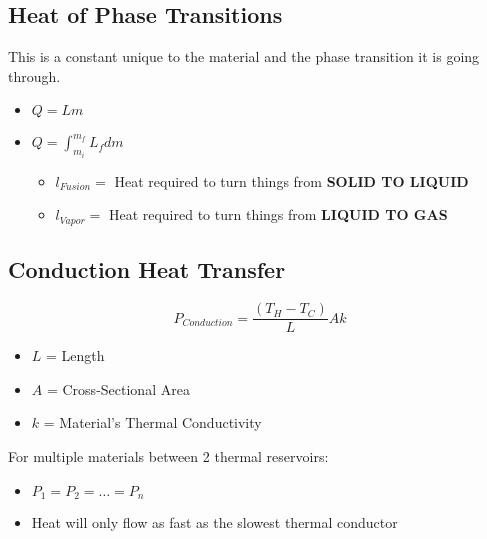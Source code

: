 	\subsection{Heat of Phase Transitions} \label{subec:Heat Phase Transitions}
	This is a constant unique to the material and the phase transition it is going through.
	\begin{itemize}[nolistsep]
		\item $Q = Lm$
		\item $Q = \int_{m_{i}}^{m_{f}} L_{f} dm$
		\begin{itemize}[noitemsep, nolistsep]
			\item $l_{Fusion} = $ Heat required to turn things from \textbf{SOLID TO LIQUID}
			\item $l_{Vapor} = $ Heat required to turn things from \textbf{LIQUID TO GAS}
		\end{itemize}
	\end{itemize}

	\subsection{Conduction Heat Transfer} \label{subsec:Conduction Heat Transfer}
	\begin{equation} \label{eq:Conduction Heat Transfer}
		P_{Conduction} = \frac{\left( T_{H} - T_{C} \right)}{L} Ak
	\end{equation}
		\begin{itemize}[noitemsep, nolistsep]
			\item $L$ = Length
			\item $A$ = Cross-Sectional Area
			\item $k$ = Material's Thermal Conductivity
		\end{itemize}
	For multiple materials between 2 thermal reservoirs:
	\begin{itemize}[noitemsep, nolistsep]
		\item $P_{1} = P_{2} = \ldots = P_{n}$
		\item Heat will only flow as fast as the slowest thermal conductor
	\end{itemize}
